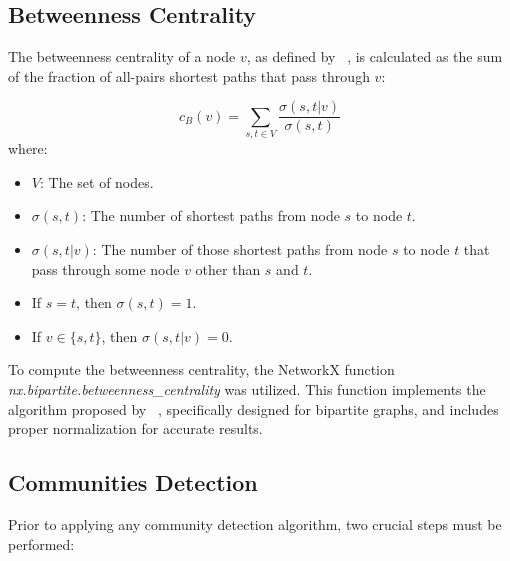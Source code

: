 
\subsection{Betweenness Centrality}
The betweenness centrality of a node \(v\), as defined by ~\cite{Brandes_2008},
is calculated as the sum of the fraction of all-pairs shortest paths that pass through \(v\):

\begin{equation}
    c_B(v) = \sum_{s,t \in V} \frac{\sigma(s, t|v)}{\sigma(s, t)} \label{eq:betweenness}
\end{equation}
\noindent
where:

\begin{itemize}
    \setlength\itemsep{0.4em} %
    \item \(V\): The set of nodes.
    \item \(\sigma(s, t)\): The number of shortest paths from node \(s\) to node \(t\).
    \item \(\sigma(s, t|v)\): The number of those shortest paths from node \(s\) to node \(t\) that pass
          through some node \(v\) other than \(s\) and \(t\).
    \item If \(s = t\), then \(\sigma(s, t) = 1\).
    \item If \(v \in \{s, t\}\), then \(\sigma(s, t|v) = 0\).
\end{itemize}
\noindent
To compute the betweenness centrality, the NetworkX function \textit{nx.bipartite.betweenness\_centrality}
was utilized. This function implements the algorithm proposed by ~\cite{Brandes_2004},
specifically designed for bipartite graphs, and includes proper normalization for accurate results.

\subsection{Communities Detection}
Prior to applying any community detection algorithm, two crucial steps must be performed:\\


